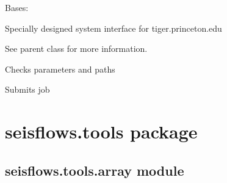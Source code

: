 \documentclass[letterpaper,10pt,english]{sphinxmanual}
\begin{document}
\begin{fulllineitems}
\label{\detokenize{ref/seisflows.system:seisflows.system.tiger_sm.tiger_sm}}
Bases: {\hyperref[\detokenize{ref/seisflows.system:seisflows.system.slurm_sm.slurm_sm}]{}}

Specially designed system interface for tiger.princeton.edu

See parent class for more information.

\begin{fulllineitems}
\label{\detokenize{ref/seisflows.system:seisflows.system.tiger_sm.tiger_sm.check}}
Checks parameters and paths

\end{fulllineitems}


\begin{fulllineitems}
\label{\detokenize{ref/seisflows.system:seisflows.system.tiger_sm.tiger_sm.submit}}
Submits job

\end{fulllineitems}


\end{fulllineitems}



\section{seisflows.tools package}
\label{\detokenize{ref/seisflows.tools:seisflows-tools-package}}\label{\detokenize{ref/seisflows.tools::doc}}

\subsection{seisflows.tools.array module}
\label{\detokenize{ref/seisflows.tools:module-seisflows.tools.array}}\label{\detokenize{ref/seisflows.tools:seisflows-tools-array-module}}
\end{document}
